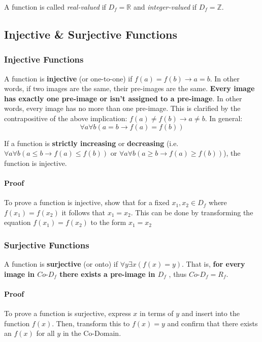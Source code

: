 A function is called \emph{real-valued} if \(D_f = \mathbb{R}\) and \emph{integer-valued} if \(D_f = \mathbb{Z} \).

\subsection{Injective \& Surjective Functions}\label{ssub:injective_&_surjective_functions}
\subsubsection{Injective Functions}\label{ssub:injective_functions}


A function is \textbf{injective} (or one-to-one) if \(f(a) = f(b) \rightarrow a = b\). In other words, if two images are the same, their pre-images are the same. \textbf{Every image has  exactly one pre-image or isn't assigned to a pre-image}. In other words, every image has no more than one pre-image. This is clarified by the contrapositive of the above implication: \(f(a) \neq f(b) \rightarrow a \neq b \). In general: \[
  \forall a \forall b(a = b \rightarrow f(a) = f(b))
\]

If a function is \textbf{strictly increasing} or \textbf{decreasing} (i.e. \( \forall a \forall b(a \leq b \rightarrow f(a) \leq f(b)) \) or \( \forall a \forall b(a \geq b \rightarrow f(a) \geq f(b)) \)), the function is injective.

\paragraph{Proof} To prove a function is injective, show that for a fixed \( x_1, x_2 \in D_f \)  where  \( f(x_1) = f(x_2)\) it follows that \( x_1 = x_2 \). This can be done by transforming the equation \( f(x_1) = f(x_2) \) to the form \( x_1 = x_2 \)  

\subsubsection{Surjective Functions}\label{ssub:surjective_functions}
A function is \textbf{surjective} (or onto) if \(\forall y \exists x(f(x) = y)\). That is, \textbf{for every image in \(Co\text{-}D_f\) there exists a pre-image in \(D_f\)} , thus \(Co\text{-}D_f = R_f\).

\paragraph{Proof} To prove a function is surjective, express \( x \) in terms of \( y \)  and insert into the function \( f(x) \). Then, transform this to \( f(x) = y \) and confirm that there exists an \( f(x) \) for all \( y \) in the Co-Domain.

